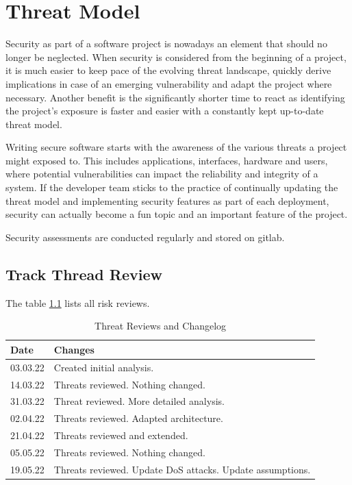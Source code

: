 \chapter{Threat Model}

Security as part of a software project is nowadays an element that should no longer be neglected. When security is considered from the beginning of a project, it is much easier to keep pace of the evolving threat landscape, quickly derive implications in case of an emerging vulnerability and adapt the project where necessary. Another benefit is the significantly shorter time to react as identifying the project's exposure is faster and easier with a constantly kept up-to-date threat model.

Writing secure software starts with the awareness of the various threats a project might exposed to. This includes applications, interfaces, hardware and users, where potential vulnerabilities can impact the reliability and integrity of a system. If the developer team sticks to the practice of continually updating the threat model and implementing security features as part of each deployment, security can actually become a fun topic and an important feature of the project.

Security assessments are conducted regularly and stored on gitlab.

\section{Track Thread Review}
The table \ref{tab:threat-review} lists all risk reviews.

\begin{table}[h!]
  \centering
  \caption{\label{tab:threat-review}Threat Reviews and Changelog}
  \begin{tabular}{ | l | l | }
    \hline
    \textbf{Date} & \textbf{Changes} \\
    \hline
    03.03.22 & Created initial analysis. \\
    \hline
    14.03.22 & Threats reviewed. Nothing changed. \\
    \hline
    31.03.22 & Threat reviewed. More detailed analysis. \\
    \hline
    02.04.22 & Threats reviewed. Adapted architecture.\\
    \hline
    21.04.22 & Threats reviewed and extended.\\
    \hline
    05.05.22 & Threats reviewed. Nothing changed. \\
    \hline
    19.05.22 & Threats reviewed. Update DoS attacks. Update assumptions. \\
    \hline
  \end{tabular}
\end{table}

